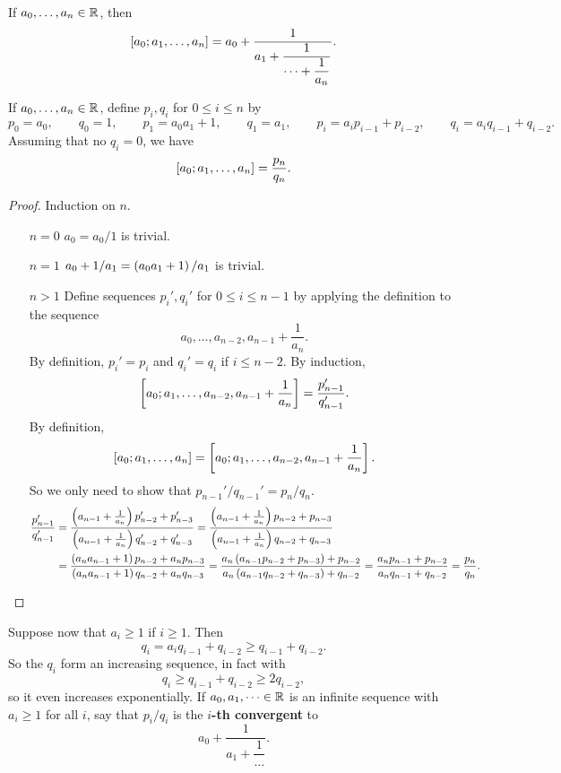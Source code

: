 If $ a_0, \dots, a_n \in \R $, then
$$ \sb{a_0; a_1, \dots, a_n} = a_0 + \dfrac{1}{a_1 + \dfrac{1}{\dots + \dfrac{1}{a_n}}}. $$

\begin{lemma}
\label{lem:68}
If $ a_0, \dots, a_n \in \R $, define $ p_i, q_i $ for $ 0 \le i \le n $ by
$$ p_0 = a_0, \qquad q_0 = 1, \qquad p_1 = a_0a_1 + 1, \qquad q_1 = a_1, \qquad p_i = a_ip_{i - 1} + p_{i - 2}, \qquad q_i = a_iq_{i - 1} + q_{i - 2}. $$
Assuming that no $ q_i = 0 $, we have
$$ \sb{a_0; a_1, \dots, a_n} = \dfrac{p_n}{q_n}. $$
\end{lemma}

\begin{proof}
Induction on $ n $.
\begin{itemize}[leftmargin=0.5in]
\item[$ n = 0 $] $ a_0 = a_0 / 1 $ is trivial.
\item[$ n = 1 $] $ a_0 + 1 / a_1 = \rb{a_0a_1 + 1} / a_1 $ is trivial.
\item[$ n > 1 $] Define sequences $ p_i', q_i' $ for $ 0 \le i \le n - 1 $ by applying the definition to the sequence
$$ a_0, \dots, a_{n - 2}, a_{n - 1} + \dfrac{1}{a_n}. $$
By definition, $ p_i' = p_i $ and $ q_i' = q_i $ if $ i \le n - 2 $. By induction,
$$ \sb{a_0; a_1, \dots, a_{n - 2}, a_{n - 1} + \dfrac{1}{a_n}} = \dfrac{p_{n - 1}'}{q_{n - 1}'}. $$
By definition,
$$ \sb{a_0; a_1, \dots, a_n} = \sb{a_0; a_1, \dots, a_{n - 2}, a_{n - 1} + \dfrac{1}{a_n}}. $$
So we only need to show that $ p_{n - 1}' / q_{n - 1}' = p_n / q_n $.
\begin{align*}
\dfrac{p_{n - 1}'}{q_{n - 1}'}
& = \dfrac{\rb{a_{n - 1} + \tfrac{1}{a_n}}p_{n - 2}' + p_{n - 3}'}{\rb{a_{n - 1} + \tfrac{1}{a_n}}q_{n - 2}' + q_{n - 3}'}
= \dfrac{\rb{a_{n - 1} + \tfrac{1}{a_n}}p_{n - 2} + p_{n - 3}}{\rb{a_{n - 1} + \tfrac{1}{a_n}}q_{n - 2} + q_{n - 3}} \\
& = \dfrac{\rb{a_na_{n - 1} + 1}p_{n - 2} + a_np_{n - 3}}{\rb{a_na_{n - 1} + 1}q_{n - 2} + a_nq_{n - 3}}
= \dfrac{a_n\rb{a_{n - 1}p_{n - 2} + p_{n - 3}} + p_{n - 2}}{a_n\rb{a_{n - 1}q_{n - 2} + q_{n - 3}} + q_{n - 2}}
= \dfrac{a_np_{n - 1} + p_{n - 2}}{a_nq_{n - 1} + q_{n - 2}}
= \dfrac{p_n}{q_n}.
\end{align*}
\end{itemize}
\end{proof}

Suppose now that $ a_i \ge 1 $ if $ i \ge 1 $. Then
$$ q_i = a_iq_{i - 1} + q_{i - 2} \ge q_{i - 1} + q_{i - 2}. $$
So the $ q_i $ form an increasing sequence, in fact with
$$ q_i \ge q_{i - 1} + q_{i - 2} \ge 2q_{i - 2}, $$
so it even increases exponentially. If $ a_0, a_1, \dots \in \R $ is an infinite sequence with $ a_i \ge 1 $ for all $ i $, say that $ p_i / q_i $ is the \textbf{$ i $-th convergent} to
$$ a_0 + \dfrac{1}{a_1 + \dfrac{1}{\dots}}. $$

